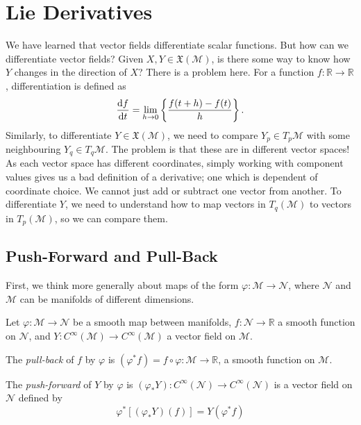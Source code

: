 \section{Lie Derivatives}%
\label{sec:lie_derivatives}

We have learned that vector fields differentiate scalar functions. But how can we differentiate vector fields?
Given $X, Y \in \mathfrak{X}(\mathcal{M})$, is there some way to know how $Y$ changes in the direction of $X$?
There is a problem here. For a function $f\colon \mathbb{R} \to \mathbb{R}$, differentiation is defined as
\begin{equation}
\dv{f}{t} = \lim_{h \to 0} \left\{ \frac{f(t + h) - f(t)}{h} \right\}.
\end{equation}
Similarly, to differentiate $Y \in \mathfrak{X}(\mathcal{M})$, we need to compare $Y_p \in T_p \mathcal{M}$ with some neighbouring $Y_q \in T_q \mathcal{M}$. The problem is that these are in different vector spaces! As each vector space has different coordinates, simply working with component values gives us a bad definition of a derivative; one which is dependent of coordinate choice. We cannot just add or subtract one vector from another.
To differentiate $Y$, we need to understand how to map vectors in $T_q (\mathcal{M})$ to vectors in $T_p(\mathcal{M})$, so we can compare them.

\subsection{Push-Forward and Pull-Back}%
\label{sub:push_forward_and_pull_back}

First, we think more generally about maps of the form $\varphi: \mathcal{M} \to \mathcal{N}$, where $\mathcal{N}$ and $\mathcal{M}$ can be manifolds of different dimensions.
\begin{definition}
  Let $\varphi\colon \mathcal{M} \to \mathcal{N}$ be a smooth map between manifolds, $f\colon \mathcal{N} \to \mathbb{R}$ a smooth function on $\mathcal{N}$, and $Y\colon C^\infty(\mathcal{M}) \to C^\infty(\mathcal{M})$ a vector field on $\mathcal{M}$.

  The \emph{pull-back} of $f$ by $\varphi$ is $(\varphi^* f) = f \circ \varphi \colon \mathcal{M} \to \mathbb{R}$, a smooth function on $\mathcal{M}$.

  The \emph{push-forward} of $Y$ by $\varphi$ is $(\varphi_* Y) \colon C^\infty(\mathcal{N}) \to C^\infty(\mathcal{N})$ is a vector field on $\mathcal{N}$ defined by
  \begin{equation}
    \varphi^* \left[ (\varphi_* Y)(f) \right] = Y(\varphi^*f) 
  \end{equation}
\end{definition}

